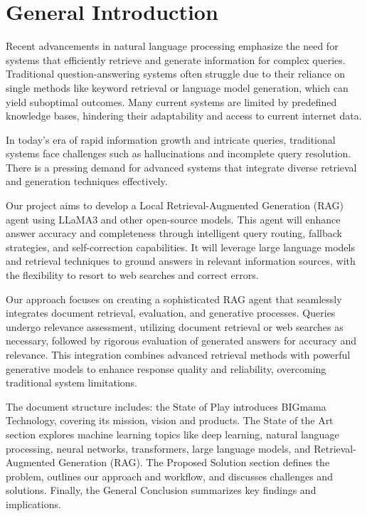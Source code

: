\chapter{General Introduction}
\setcounter{page}{14}

Recent advancements in natural language processing emphasize the need for systems that efficiently retrieve and generate information for complex queries. Traditional question-answering systems often struggle due to their reliance on single methods like keyword retrieval or language model generation, which can yield suboptimal outcomes. Many current systems are limited by predefined knowledge bases, hindering their adaptability and access to current internet data.

\hfill

In today's era of rapid information growth and intricate queries, traditional systems face challenges such as hallucinations and incomplete query resolution. There is a pressing demand for advanced systems that integrate diverse retrieval and generation techniques effectively.

\hfill

Our project aims to develop a Local Retrieval-Augmented Generation (RAG) agent using LLaMA3 and other open-source models. This agent will enhance answer accuracy and completeness through intelligent query routing, fallback strategies, and self-correction capabilities. It will leverage large language models and retrieval techniques to ground answers in relevant information sources, with the flexibility to resort to web searches and correct errors.

\hfill

Our approach focuses on creating a sophisticated RAG agent that seamlessly integrates document retrieval, evaluation, and generative processes. Queries undergo relevance assessment, utilizing document retrieval or web searches as necessary, followed by rigorous evaluation of generated answers for accuracy and relevance. This integration combines advanced retrieval methods with powerful generative models to enhance response quality and reliability, overcoming traditional system limitations.

\hfill

The document structure includes: the State of Play introduces BIGmama Technology, covering its mission, vision and products. The State of the Art section explores machine learning topics like deep learning, natural language processing, neural networks, transformers, large language models, and Retrieval-Augmented Generation (RAG). The Proposed Solution section defines the problem, outlines our approach and workflow, and discusses challenges and solutions. Finally, the General Conclusion summarizes key findings and implications.
